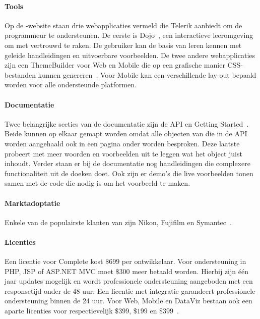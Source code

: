 \paragraph{Tools}
Op de \kendo{}-website staan drie webapplicaties vermeld die Telerik aanbiedt om de programmeur te ondersteunen.
De eerste is \kendo{} Dojo~\cite{Telerika},  een interactieve leeromgeving om met \kendo{} vertrouwd te raken.
De gebruiker kan de basis van \kendo{} leren kennen met geleide handleidingen en uitvoerbare voorbeelden.
De twee andere webapplicaties zijn een ThemeBuilder voor Web en Mobile die op een grafische manier CSS-bestanden kunnen genereren~\cite{Telerikb,Telerikc}.
Voor \kendo{} Mobile kan een verschillende lay-out bepaald worden voor alle ondersteunde platformen.

\paragraph{Documentatie}
Twee belangrijke secties van de documentatie zijn de API en Getting Started~\cite{Telerikd}.
Beide kunnen op elkaar gemapt worden omdat alle objecten van \kendo{} die in de API worden aangehaald ook in een pagina onder  worden besproken.
Deze laatste probeert met meer woorden en voorbeelden uit te leggen wat het object juist inhoudt.
Verder staan er bij de documentatie nog handleidingen die complexere functionaliteit uit de doeken doet.
Ook zijn er demo's die live voorbeelden tonen samen met de code die nodig is om het voorbeeld te maken.

\paragraph{Marktadoptatie}
Enkele van de populairste klanten van \kendo{} zijn Nikon,  Fujifilm en Symantec~\cite{Telerike}.

\paragraph{Licenties}
Een licentie voor \kendo{} Complete kost $\$699$ per ontwikkelaar.
Voor ondersteuning in PHP,  JSP of ASP.NET MVC moet $\$300$ meer betaald worden.
Hierbij zijn één jaar updates mogelijk en wordt professionele ondersteuning aangeboden met een responsetijd onder de 48 uur.
Een licentie met integratie garandeert professionele ondersteuning binnen de 24 uur.
Voor \kendo{} Web,  Mobile en DataViz bestaan ook een aparte licenties voor respectievelijk $\$399$,  $\$199$ en $\$399$~\cite{Telerik}.

